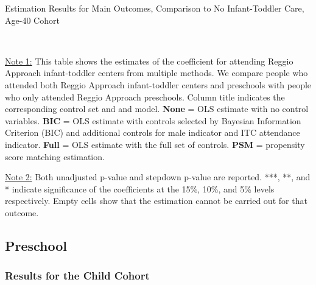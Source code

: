 \begin{table}[H] \caption{Estimation Results for Main Outcomes, Comparison to No Infant-Toddler Care, Age-40 Cohort} \label{ols-M-adult40-reg-nopres-asilo}
\scalebox{0.63}{}
\vspace{1ex} \\
\footnotesize\raggedright{\underline{Note 1:} This table shows the estimates of the coefficient for attending Reggio Approach infant-toddler centers from multiple methods. We compare people who attended both Reggio Approach infant-toddler centers and preschools with people who only attended Reggio Approach preschools. Column title indicates the corresponding control set and and model.  \textbf{None} = OLS estimate with no control variables. \textbf{BIC} = OLS estimate with controls selected by Bayesian Information Criterion (BIC) and additional controls for male indicator and ITC attendance indicator. \textbf{Full} = OLS estimate with the full set of controls. \textbf{PSM} =  propensity score matching estimation.}

\footnotesize\raggedright{\underline{Note 2:} Both unadjusted p-value and stepdown p-value are reported. ***, **, and * indicate significance of the coefficients at the 15\%, 10\%, and 5\% levels respectively. Empty cells show that the estimation cannot be carried out for that outcome.}
\end{table}

\subsection{Preschool}

\subsubsection{Results for the Child Cohort}

